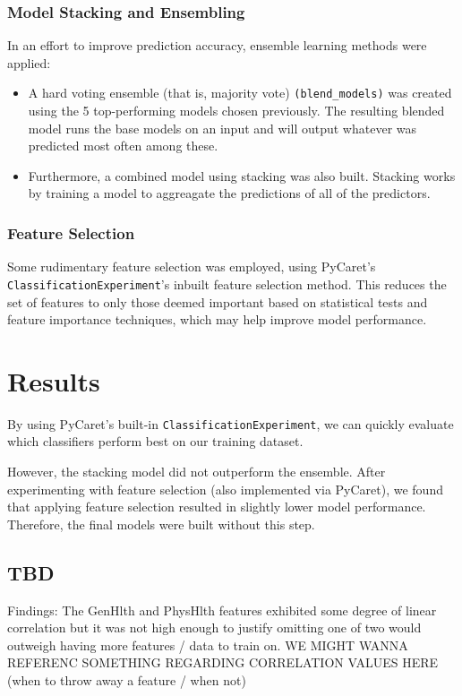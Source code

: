 \documentclass[a4paper,12pt]{article}
\begin{document}
\subsubsection{Model Stacking and Ensembling}
In an effort to improve prediction accuracy, ensemble learning methods were applied:
\begin{itemize}
    \item A hard voting ensemble (that is, majority vote) \texttt{(blend\_models)} was created using the 
    5 top-performing models chosen previously. The resulting blended model runs the base models on an input
    and will output whatever was predicted most often among these.
    \item Furthermore, a combined model using stacking was also built. 
    Stacking works by training a model to aggreagate the predictions of all of the predictors. 
    
\end{itemize} 

\subsubsection{Feature Selection}
Some rudimentary feature selection was employed, using PyCaret's \texttt{ClassificationExperiment}'s inbuilt
feature selection method. This reduces the set of features to only those deemed important based on
statistical tests and feature importance techniques, which may help improve model performance.

\section{Results}
By using PyCaret's built-in \texttt{ClassificationExperiment}, we can quickly evaluate which classifiers perform best on our training dataset.


However, the stacking model did not outperform the ensemble.
After experimenting with feature selection (also implemented via PyCaret), we found that applying 
feature selection resulted in slightly lower model performance. Therefore, the final models were 
built without this step.

\subsection{TBD}
Findings: The GenHlth and PhysHlth features exhibited some degree of linear correlation but it was
not high enough to justify omitting one of two would outweigh having more features / data to train 
on.
WE MIGHT WANNA REFERENC SOMETHING REGARDING CORRELATION VALUES HERE 
(when to throw away a feature / when not)
\end{document}
